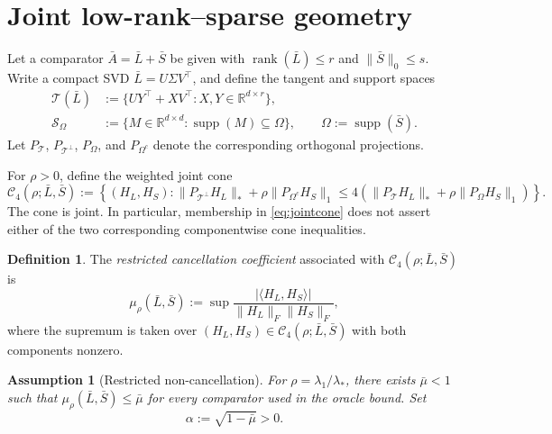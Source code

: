 \documentclass[12pt]{article}
\newtheorem{assumption}{Assumption}
\theoremstyle{definition}
\newtheorem{definition}{Definition}
\DeclareMathOperator{\rank}{rank}
\DeclareMathOperator{\supp}{supp}
\begin{document}
	\section{Joint low-rank--sparse geometry} \label{sec:geometry}
	
	Let a comparator $\bar A=\bar L+\bar S$ be given with $\rank(\bar L)\le r$ and $\|\bar S\|_0\le s$. Write a compact SVD $\bar L=U\Sigma V^\top$, and define the tangent and support spaces
	\begin{align}
		\mathcal T(\bar L)&:=\{UY^\top+XV^\top:X,Y\in\mathbb R^{d\times r}\},\label{eq:tangent}\\
		\mathcal S_\Omega&:=\{M\in\mathbb R^{d\times d}:\supp(M)\subseteq\Omega\},
		\qquad \Omega:=\supp(\bar S).\label{eq:support}
	\end{align}
	Let $P_\mathcal T$, $P_{\mathcal T^\perp}$, $P_\Omega$, and $P_{\Omega^c}$ denote the corresponding orthogonal projections.
	
	For $\rho>0$, define the weighted joint cone
	\begin{equation}
		\mathcal C_4(\rho;\bar L,\bar S) :=\left\{(H_L,H_S): \|P_{\mathcal T^\perp}H_L\|_*+\rho\|P_{\Omega^c}H_S\|_1 \le4\left( \|P_\mathcal T H_L\|_*+\rho\|P_\Omega H_S\|_1 	\right)\right\}.
		\label{eq:jointcone}
	\end{equation}
	The cone is joint. In particular, membership in \eqref{eq:jointcone} does not assert either of the two corresponding componentwise cone inequalities.
	
	\begin{definition}\label{def:mu}
		The \emph{restricted cancellation coefficient} associated with
		$\mathcal C_4(\rho;\bar L,\bar S)$ is
		\begin{equation}
			\mu_\rho(\bar L,\bar S)
			:=
			\sup
			\frac{|\langle H_L,H_S\rangle|}
			{\|H_L\|_F\|H_S\|_F},
			\label{eq:mu}
		\end{equation}
		where the supremum is taken over
		$(H_L,H_S)\in\mathcal C_4(\rho;\bar L,\bar S)$
		with both components nonzero.
	\end{definition}
	
	\begin{assumption}[Restricted non-cancellation]\label{ass:angle}
		For $\rho=\lambda_1/\lambda_*$, there exists $\bar\mu<1$ such that $\mu_\rho(\bar L,\bar S)\le\bar\mu$ for every comparator used in the oracle bound. Set 
		\begin{equation}
			\alpha:=\sqrt{1-\bar\mu}>0. \label{eq:alpha}
		\end{equation}
	\end{assumption}
	
\end{document}
